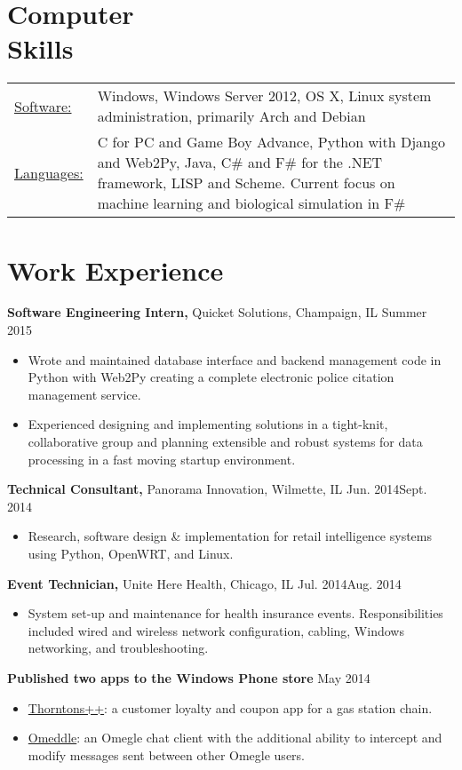 \documentclass[margin]{res}
\begin{document}
\begin{resume}
\section{Computer \\ Skills}
  \begin{tabular}{l p{3in}}
    \underline{Software:} & Windows, Windows Server 2012, OS X, Linux system administration, primarily Arch and Debian \\
    \underline{Languages:} & C for PC and Game Boy Advance, Python with Django and Web2Py, Java, C\# and F\# for the .NET framework, LISP and Scheme. Current focus on machine learning and biological simulation in F\#
 \end{tabular}

\section{Work Experience}

{\bf Software Engineering Intern,} Quicket Solutions, Champaign, IL \hfill Summer 2015
\begin{itemize} \itemsep -2pt  %
\item Wrote and maintained database interface and backend management code in Python with Web2Py creating a complete electronic police citation management service.
\item Experienced designing and implementing solutions in a tight-knit, collaborative group and planning extensible and robust systems for data processing in a fast moving startup environment.
\end{itemize}

{\bf Technical Consultant,} Panorama Innovation, Wilmette, IL \hfill Jun. 2014\textendash Sept. 2014
\begin{itemize} \itemsep -2pt  %
\item Research, software design \& implementation for retail intelligence systems using Python, OpenWRT, and Linux.
\end{itemize}

{\bf Event Technician,} Unite Here Health, Chicago, IL \hfill Jul. 2014\textendash Aug. 2014
\begin{itemize} \itemsep -2pt  %
\item System set-up and maintenance for health insurance events. Responsibilities included wired and wireless network configuration, cabling, Windows networking, and troubleshooting.
\end{itemize}

{\bf Published two apps to the Windows Phone store} \hfill May 2014
\begin{itemize} \itemsep -2pt  %
\item \underline{Thorntons++}: a customer loyalty and coupon app for a gas station chain.
\item \underline{Omeddle}: an Omegle chat client with the additional ability to intercept and modify messages sent between other Omegle users.
\end{itemize}

\end{resume}
\end{document}
